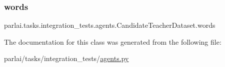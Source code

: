 \subsubsection{\texorpdfstring{words}{words}}
{\footnotesize\ttfamily parlai.\+tasks.\+integration\+\_\+tests.\+agents.\+Candidate\+Teacher\+Dataset.\+words}



The documentation for this class was generated from the following file\+:\begin{DoxyCompactItemize}
\item 
parlai/tasks/integration\+\_\+tests/\hyperlink{parlai_2tasks_2integration__tests_2agents_8py}{agents.\+py}\end{DoxyCompactItemize}
